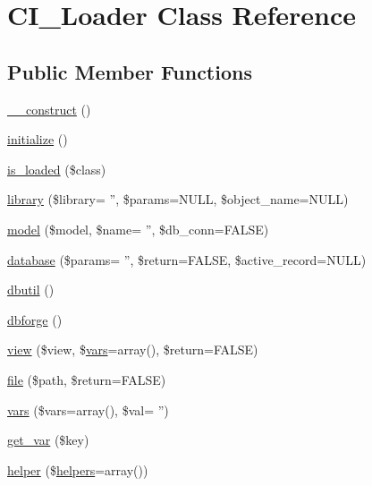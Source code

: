 \hypertarget{class_c_i___loader}{\section{C\-I\-\_\-\-Loader Class Reference}
\label{class_c_i___loader}
}
\subsection*{Public Member Functions}
\begin{DoxyCompactItemize}
\item 
\hyperlink{class_c_i___loader_a095c5d389db211932136b53f25f39685}{\-\_\-\-\_\-construct} ()
\item 
\hyperlink{class_c_i___loader_a91098fa7d1917ce4833f284bbef12627}{initialize} ()
\item 
\hyperlink{class_c_i___loader_a57ba1b43ec1d58c07a2d1e8cd00b9658}{is\-\_\-loaded} (\$class)
\item 
\hyperlink{class_c_i___loader_a107e711d913e6008ee5f4d557655afd3}{library} (\$library= '', \$params=N\-U\-L\-L, \$object\-\_\-name=N\-U\-L\-L)
\item 
\hyperlink{class_c_i___loader_a3f2fc35ce58c58b39980136502db18e8}{model} (\$model, \$name= '', \$db\-\_\-conn=F\-A\-L\-S\-E)
\item 
\hyperlink{class_c_i___loader_a22d288c451a7ebb77c814d21a1cb0a1c}{database} (\$params= '', \$return=F\-A\-L\-S\-E, \$active\-\_\-record=N\-U\-L\-L)
\item 
\hyperlink{class_c_i___loader_afca757331ddb1ee832af732a2f624882}{dbutil} ()
\item 
\hyperlink{class_c_i___loader_a4e719447bdbd4829418772916630949c}{dbforge} ()
\item 
\hyperlink{class_c_i___loader_a338c66f36b2406ff1e14e7d64515b40c}{view} (\$view, \$\hyperlink{class_c_i___loader_a81f52eab55f5b998b1956ea67e58fcc3}{vars}=array(), \$return=F\-A\-L\-S\-E)
\item 
\hyperlink{class_c_i___loader_a47e4b8eda2bbf9e8bb505cdafb8e4ba5}{file} (\$path, \$return=F\-A\-L\-S\-E)
\item 
\hyperlink{class_c_i___loader_a81f52eab55f5b998b1956ea67e58fcc3}{vars} (\$vars=array(), \$val= '')
\item 
\hyperlink{class_c_i___loader_a06567b423ba6d5b852808e581ef00fb0}{get\-\_\-var} (\$key)
\item 
\hyperlink{class_c_i___loader_a2da00ff269596262b62c0c6032b2996f}{helper} (\$\hyperlink{class_c_i___loader_a2c39d50f31ce66ffe936e4f68219e275}{helpers}=array())

\end{DoxyCompactItemize}
